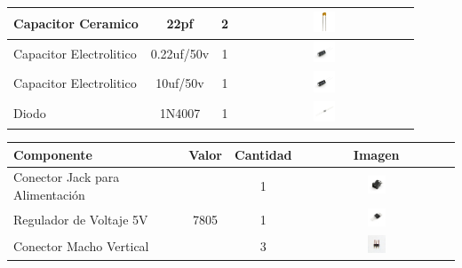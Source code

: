 \documentclass[a4paper,10pt]{book}
\begin{document}
\begin{center}
\begin{tabular}{| l | c | c |  c |}
      Capacitor Ceramico	 	& 22pf			& 2 			& \includegraphics[width=0.125\textwidth]{img/22.jpg} \\ \hline
      Capacitor Electrolitico	 	& 0.22uf/50v		& 1 			& \includegraphics[width=0.125\textwidth]{img/electrolitico.jpg} \\ \hline
      Capacitor Electrolitico	 	& 10uf/50v		& 1 			& \includegraphics[width=0.125\textwidth]{img/electrolitico.jpg} \\ \hline
      Diodo			 	& 1N4007		& 1 			& \includegraphics[width=0.125\textwidth]{img/diodo.jpg} \\ \hline   
   \end{tabular}
   \newpage 
   \begin{tabular}{| l | c | c |  c |}
     \hline
      {\bfseries Componente}		& {\bfseries Valor}	& {\bfseries Cantidad} 	& {\bfseries Imagen} \\ \hline  
      Conector Jack para Alimentación	& 			& 1 			& \includegraphics[width=0.125\textwidth]{img/jack.jpg} \\ \hline
      Regulador de Voltaje 5V		& 7805			& 1 			& \includegraphics[width=0.125\textwidth]{img/7805.jpg} \\ \hline
      Conector Macho Vertical		& 			& 3 			& \includegraphics[width=0.125\textwidth]{img/espadin.jpg} \\ \hline

\end{tabular}
\end{center}
\end{document}
